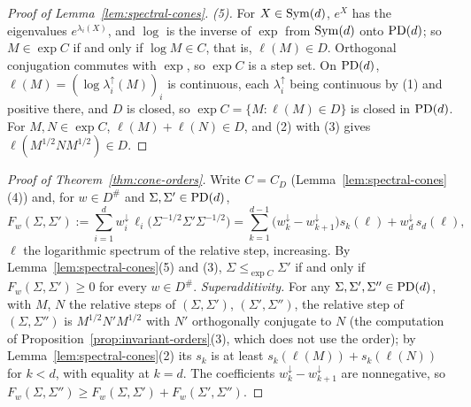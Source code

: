 \begin{proof}[Proof of Lemma~\ref{lem:spectral-cones}]
\emph{(5).} For $X \in \mathrm{Sym}(d)$, $e^X$ has the eigenvalues $e^{\lambda_i(X)}$, and $\log$ is the inverse of
$\exp$ from $\mathrm{Sym}(d)$ onto $\mathrm{PD}(d)$; so $M \in \exp C$ if and only if $\log M \in C$, that is,
$\ell(M) \in D$. Orthogonal conjugation commutes with $\exp$, so $\exp C$ is a step set. On $\mathrm{PD}(d)$,
$\ell(M) = (\log\lambda^\uparrow_i(M))_i$ is continuous, each $\lambda^\uparrow_i$ being continuous by (1)
and positive there, and $D$ is closed, so $\exp C = \{M : \ell(M) \in D\}$ is closed in $\mathrm{PD}(d)$. For
$M, N \in \exp C$, $\ell(M) + \ell(N) \in D$, and (2) with (3) gives $\ell(M^{1/2}NM^{1/2}) \in D$.
\end{proof}

\begin{proof}[Proof of Theorem~\ref{thm:cone-orders}]
Write $C = C_D$ (Lemma~\ref{lem:spectral-cones}(4)) and, for $w \in D^\#$ and $\Sigma, \Sigma' \in \mathrm{PD}(d)$,
\[
  F_w(\Sigma, \Sigma') := \sum_{i=1}^dw^\downarrow_i\,\ell_i\bigl(\Sigma^{-1/2}\Sigma'\Sigma^{-1/2}\bigr)
  = \sum_{k=1}^{d-1}\bigl(w^\downarrow_k - w^\downarrow_{k+1}\bigr)s_k(\ell) + w^\downarrow_d\,s_d(\ell) ,
\]
$\ell$ the logarithmic spectrum of the relative step, increasing. By Lemma~\ref{lem:spectral-cones}(5) and (3),
$\Sigma \le_{\exp C} \Sigma'$ if and only if $F_w(\Sigma, \Sigma') \ge 0$ for every $w \in D^\#$.
\emph{Superadditivity.} For any $\Sigma, \Sigma', \Sigma'' \in \mathrm{PD}(d)$, with $M$, $N$ the relative steps of
$(\Sigma, \Sigma')$, $(\Sigma', \Sigma'')$, the relative step of $(\Sigma, \Sigma'')$ is
$M^{1/2}N'M^{1/2}$ with $N'$ orthogonally conjugate to $N$ (the computation of
Proposition~\ref{prop:invariant-orders}(3), which does not use the order); by Lemma~\ref{lem:spectral-cones}(2) its $s_k$ is
at least $s_k(\ell(M)) + s_k(\ell(N))$ for $k < d$, with equality at $k = d$. The coefficients
$w^\downarrow_k - w^\downarrow_{k+1}$ are nonnegative, so
$F_w(\Sigma, \Sigma'') \ge F_w(\Sigma, \Sigma') + F_w(\Sigma', \Sigma'')$.


\end{proof}

